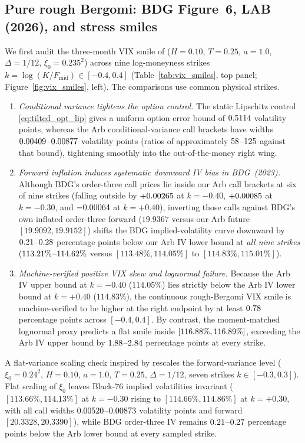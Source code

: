 \subsection{Pure rough Bergomi: BDG Figure~6, LAB (2026), and stress smiles}\label{sec:pure_smiles}
We first audit the three-month VIX smile of \citet[Figure~6]{BourgeyDeMarcoGobet2023} ($H=0.10$,
$T=0.25$, $a=1.0$, $\Delta=1/12$, $\xi_0=0.235^2$) across nine log-moneyness strikes
$k=\log(K/F_{\mathrm{mid}})\in[-0.4,0.4]$ (Table~\ref{tab:vix_smiles}, top panel; Figure~\ref{fig:vix_smiles},
left). The comparisons use common physical strikes.
\begin{enumerate}
\item \emph{Conditional variance tightens the option control.} The static Lipschitz
  control \eqref{eq:tilted_opt_lip} gives a uniform option error bound of $0.5114$ volatility points,
  whereas the Arb conditional-variance call brackets have widths $0.00409$--$0.00877$ volatility points
  (ratios of approximately $58$--$125$ against that bound), tightening smoothly into the out-of-the-money right wing.
\item \emph{Forward inflation induces systematic downward IV bias in BDG~(2023).} Although BDG's
  order-three call prices lie inside our Arb call brackets at six of nine strikes (falling outside by
  $+0.00265$ at $k=-0.40$, $+0.00085$ at $k=-0.30$, and $-0.00064$ at $k=+0.40$), inverting those calls
  against BDG's own inflated order-three forward ($19.9367$ versus our Arb future $[19.9092,19.9152]$)
  shifts the BDG implied-volatility curve downward by $0.21$--$0.28$ percentage points
  below our Arb IV lower bound at \emph{all nine strikes} ($113.21\%$--$114.62\%$ versus $[113.48\%,114.05\%]$ to
  $[114.83\%,115.01\%]$).
\item \emph{Machine-verified positive VIX skew and lognormal failure.} Because the Arb IV upper bound at
  $k=-0.40$ ($114.05\%$) lies strictly below the Arb IV lower bound at $k=+0.40$ ($114.83\%$), the
  continuous rough-Bergomi VIX smile is machine-verified to be higher at the right endpoint by at least $0.78$
  percentage points across $[-0.4,0.4]$. By contrast, the moment-matched lognormal proxy predicts a flat
  smile inside $[116.88\%,116.89\%]$, exceeding the Arb IV upper bound by
  $1.88$--$2.84$ percentage points at every strike.
\end{enumerate}

A flat-variance scaling check inspired by \citet{LiaoAgarwalBourgey2026} rescales the forward-variance
level ($\xi_0=0.24^2$, $H=0.10$, $a=1.0$, $T=0.25$, $\Delta=1/12$, seven strikes $k\in[-0.3,0.3]$). Flat scaling
of $\xi_0$ leaves Black-76 implied volatilities invariant ($[113.66\%,114.13\%]$ at $k=-0.30$ rising to
$[114.66\%,114.86\%]$ at $k=+0.30$, with all call widths $0.00520$--$0.00873$ volatility points and
forward $[20.3328,20.3390]$), while BDG order-three IV remains $0.21$--$0.27$ percentage points below the
Arb lower bound at every sampled strike.

